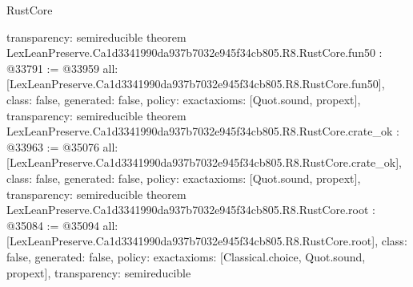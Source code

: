 \begin{lexlean}{RustCore}
\begin{coremodule}
{  transparency: semireducible
}
theorem LexLeanPreserve.Ca1d3341990da937b7032e945f34cb805.R8.RustCore.fun50 : @33791 := @33959 {
  all: [LexLeanPreserve.Ca1d3341990da937b7032e945f34cb805.R8.RustCore.fun50],
  class: false,
  generated: false,
  policy: exact{axioms: [Quot.sound, propext]},
  transparency: semireducible
}
theorem LexLeanPreserve.Ca1d3341990da937b7032e945f34cb805.R8.RustCore.crate_ok : @33963 := @35076 {
  all: [LexLeanPreserve.Ca1d3341990da937b7032e945f34cb805.R8.RustCore.crate_ok],
  class: false,
  generated: false,
  policy: exact{axioms: [Quot.sound, propext]},
  transparency: semireducible
}
theorem LexLeanPreserve.Ca1d3341990da937b7032e945f34cb805.R8.RustCore.root : @35084 := @35094 {
  all: [LexLeanPreserve.Ca1d3341990da937b7032e945f34cb805.R8.RustCore.root],
  class: false,
  generated: false,
  policy: exact{axioms: [Classical.choice, Quot.sound, propext]},
  transparency: semireducible
}


\end{coremodule}
\end{lexlean}
